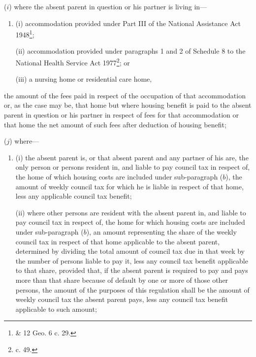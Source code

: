 \documentclass[a4paper]{article}
\begin{document}
\begin{enumerate}
($i$) where the absent parent in question or his partner is living in—
\begin{enumerate}\item[]
(i) accommodation provided under Part III of the National Assistance Act 1948\footnote{ \& 12 Geo. 6 c. 29.};

(ii) accommodation provided under paragraphs 1 and 2 of Schedule 8 to the National Health Service Act 1977\footnote{ c. 49.}; or

(iii) a nursing home or residential care home,
\end{enumerate}
the amount of the fees paid in respect of the occupation of that accommodation or, as the case may be, that home
but where housing benefit is paid to the absent parent in question or his partner in respect of fees for that accommodation or that home the net amount of such fees after deduction of housing benefit;  %


($j$) where—
\begin{enumerate}\item[]
(i) the absent parent is, or that absent parent and any partner of his are, the only person or persons resident in, and liable to pay council tax in respect of, the home of which housing costs are included under sub-paragraph ($b$), the amount of weekly council tax for which he is liable in respect of that home, less any applicable council tax benefit;

(ii) where other persons are resident with the absent parent in, and liable to pay council tax in respect of, the home for which housing costs are included under sub-paragraph ($b$), an amount representing the share of the weekly council tax in respect of that home applicable to the absent parent, determined by dividing the total amount of council tax due in that week by the number of persons liable to pay it, less any council tax benefit applicable to that share, provided that, if the absent parent is required to pay and pays more than that share because of default by one or more of those other persons, the amount of the purposes of this regulation shall be the amount of weekly council tax the absent parent pays, less any council tax benefit applicable to such amount;
\end{enumerate}


\end{enumerate}
\end{document}

